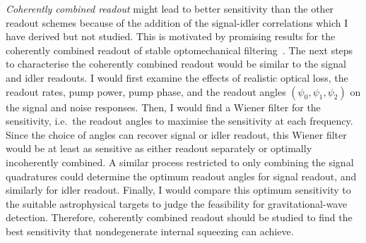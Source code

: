 \emph{Coherently combined readout} might lead to better sensitivity than the other readout schemes because of the addition of the signal-idler correlations which I have derived but not studied. This is motivated by promising results for the coherently combined readout of stable optomechanical filtering~\cite{liEnhancingInterferometerSensitivity2021}. The next steps to characterise the coherently combined readout would be similar to the signal and idler readouts. I would first examine the effects of realistic optical loss, the readout rates, pump power, pump phase, and the readout angles $(\psi_0,\psi_1,\psi_2)$ on the signal and noise responses. Then, I would find a Wiener filter for the sensitivity, i.e.\ the readout angles to maximise the sensitivity at each frequency. Since the choice of angles can recover signal or idler readout, this Wiener filter would be at least as sensitive as either readout separately or optimally incoherently combined. A similar process restricted to only combining the signal quadratures could determine the optimum readout angles for signal readout, and similarly for idler readout. Finally, I would compare this optimum sensitivity to the suitable astrophysical targets to judge the feasibility for gravitational-wave detection.
Therefore, coherently combined readout should be studied to find the best sensitivity that nondegenerate internal squeezing can achieve.


